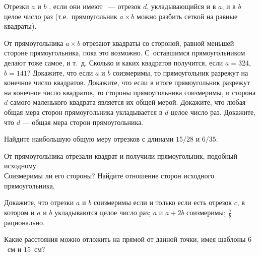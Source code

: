 \documentclass[12pt,a4paper]{article}
\begin{document}



Отрезки $a$ и $b$ , если они имеют
\ --- отрезок $d$, укладывающийся
и в $a$, и в $b$ целое число раз (т.е.~прямоугольник $a\times b$ можно разбить сеткой на равные квадраты).

От прямоугольника %
$a\times b$ отрезают квадраты со стороной, равной меньшей стороне
прямоугольника, пока это возможно. %
С~оставшимся прямоугольником делают тоже самое,
и т.~д.
Сколько и каких квадратов получится, если
$a=324$, $b=141$?
Докажите, что если $a$ и $b$ %
соизмеримы, то
прямоугольник разрежут на конечное число квадратов.
Докажите, что если в итоге прямоугольник разрежут на
конечное число квадратов, то стороны прямоугольника соизмеримы, и
сторона $d$ %
самого маленького
квадрата является их общей мерой.
 Докажите, что любая общая мера сторон прямоугольника укладывается в $d$ целое число раз.
Докажите, что $d$ --- 
общая мера сторон прямоугольника.


Найдите наибольшую общую меру отрезков с длинами
$15/28$ и $6/35$.

От прямоугольника отрезали квадрат и получили прямоугольник,
подобный исходному.\\
Соизмеримы ли его стороны?
Найдите отношение сторон исходного прямоугольника.

Докажите, что отрезки $a$ и $b$ соизмеримы если и только если
 есть отрезок $c$, в котором и $a$ и $b$ укладываются
целое число раз;
 $a$ и $a+2b$ соизмеримы;
 $\frac ab$ рационально.



Какие расстояния можно отложить на прямой от данной точки,
имея шаблоны $6$~см и $15$~см?
\end{document}
